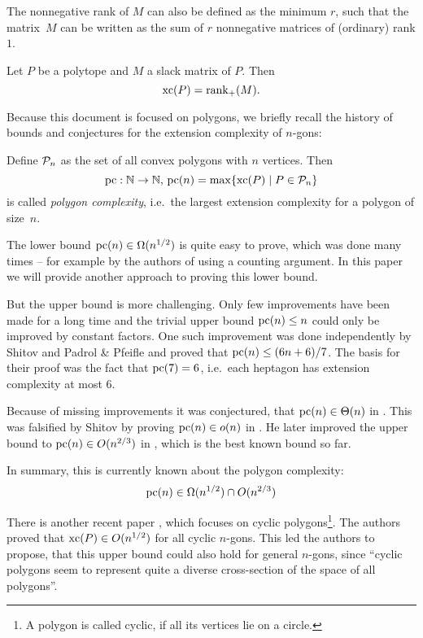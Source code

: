 The nonnegative rank of $M$ can also be defined as the minimum $r$, such that the matrix~$M$ can be written as the sum of $r$ nonnegative matrices of (ordinary) rank $1$.

\begin{theorem}
  Let $P$ be a polytope and $M$ a slack matrix of $P$. Then $$\xc(P) = \rank_+(M) .$$
\end{theorem}

Because this document is focused on polygons, we briefly recall the history of bounds and conjectures for the extension complexity of $n$-gons:

Define $\P_n$ as the set of all convex polygons with $n$ vertices. Then $$\pc:\N \to \N,\,\pc(n) = \max \{\xc(P) \mid P \in \P_n\}$$ is called \emph{polygon complexity}, i.e.\ the largest extension complexity for a polygon of size~$n$.

The lower bound $\pc(n) \in \Omega(n^{1/2})$ is quite easy to prove, which was done many times -- for example by the authors of \cite{fiorini2012extended} using a counting argument. In this paper we will provide another approach to proving this lower bound. 

But the upper bound is more challenging. Only few improvements have been made for a long time and the trivial upper bound $\pc(n) \leq n$ could only be improved by constant factors. One such improvement was done independently by Shitov \cite{shitov2014upper} and Padrol \& Pfeifle \cite{padrol2014polygons} and proved that $\pc(n) \leq (6n+6)/7$. The basis for their proof was the fact that $\pc(7)=6$, i.e.\ each heptagon has extension complexity at most 6.

Because of missing improvements it was conjectured, that $\pc(n) \in \Theta(n)$ in \cite{fiorini2012extended}. This was falsified by Shitov by proving $\pc(n) \in o(n)$ in \cite{shitov2014sublinear}. He later improved the upper bound to $\pc(n) \in O(n^{2/3})$ in \cite{shitov2020sublinear}, which is the best known bound so far.

In summary, this is currently known about the polygon complexity:
$$\pc(n) \in \Omega(n^{1/2}) \cap O(n^{2/3})$$

There is another recent paper \cite{kwan2020extension}, which focuses on cyclic polygons\footnote{A polygon is called cyclic, if all its vertices lie on a circle.}. The authors proved that $\xc(P) \in O(n^{1/2})$ for all cyclic $n$-gons. 
This led the authors to propose, that this upper bound could also hold for general $n$-gons, since ``cyclic polygons seem to represent quite a diverse cross-section of the space of all polygons''.



